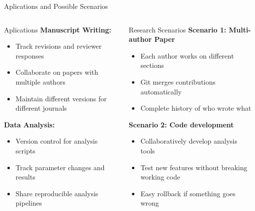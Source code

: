 \documentclass[aspectratio=1609]{beamer}
\begin{document}
    \begin{frame}{Aplications and Possible Scenarios}
        \small
        \begin{columns}
            \begin{column}{0.55\linewidth}
                \begin{talert}{Aplications}
                    \textbf{Manuscript Writing:}
                    \begin{itemize}
                        \item Track revisions and reviewer responses
                        \item Collaborate on papers with multiple authors
                        \item Maintain different versions for different journals
                    \end{itemize}
                    \textbf{Data Analysis:}
                    \begin{itemize}
                        \item Version control for analysis scripts
                        \item Track parameter changes and results
                        \item Share reproducible analysis pipelines
                    \end{itemize}
                \end{talert}
            \end{column}
            \begin{column}{0.55\linewidth}
                \begin{texample}{Research Scenarios}
                    \textbf{Scenario 1: Multi-author Paper}
                    \begin{itemize}
                        \item Each author works on different sections
                        \item Git merges contributions automatically
                        \item Complete history of who wrote what
                    \end{itemize}
                    \textbf{Scenario 2: Code development}
                    \begin{itemize}
                        \item Collaboratively develop analysis tools
                        \item Test new features without breaking working code
                        \item Easy rollback if something goes wrong
                    \end{itemize}
                \end{texample}
            \end{column}
        \end{columns}
        
    \end{frame}
\end{document}
